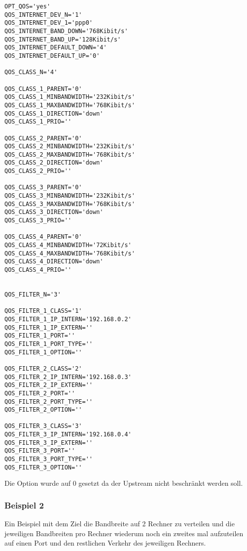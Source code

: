 \begin{small}
\begin{example}
\begin{verbatim}
OPT_QOS='yes'
QOS_INTERNET_DEV_N='1'
QOS_INTERNET_DEV_1='ppp0'
QOS_INTERNET_BAND_DOWN='768Kibit/s'
QOS_INTERNET_BAND_UP='128Kibit/s'
QOS_INTERNET_DEFAULT_DOWN='4'
QOS_INTERNET_DEFAULT_UP='0'

QOS_CLASS_N='4'

QOS_CLASS_1_PARENT='0'
QOS_CLASS_1_MINBANDWIDTH='232Kibit/s'
QOS_CLASS_1_MAXBANDWIDTH='768Kibit/s'
QOS_CLASS_1_DIRECTION='down'
QOS_CLASS_1_PRIO=''

QOS_CLASS_2_PARENT='0'
QOS_CLASS_2_MINBANDWIDTH='232Kibit/s'
QOS_CLASS_2_MAXBANDWIDTH='768Kibit/s'
QOS_CLASS_2_DIRECTION='down'
QOS_CLASS_2_PRIO=''

QOS_CLASS_3_PARENT='0'
QOS_CLASS_3_MINBANDWIDTH='232Kibit/s'
QOS_CLASS_3_MAXBANDWIDTH='768Kibit/s'
QOS_CLASS_3_DIRECTION='down'
QOS_CLASS_3_PRIO=''

QOS_CLASS_4_PARENT='0'
QOS_CLASS_4_MINBANDWIDTH='72Kibit/s'
QOS_CLASS_4_MAXBANDWIDTH='768Kibit/s'
QOS_CLASS_4_DIRECTION='down'
QOS_CLASS_4_PRIO=''


QOS_FILTER_N='3'

QOS_FILTER_1_CLASS='1'
QOS_FILTER_1_IP_INTERN='192.168.0.2'
QOS_FILTER_1_IP_EXTERN=''
QOS_FILTER_1_PORT=''
QOS_FILTER_1_PORT_TYPE=''
QOS_FILTER_1_OPTION=''

QOS_FILTER_2_CLASS='2'
QOS_FILTER_2_IP_INTERN='192.168.0.3'
QOS_FILTER_2_IP_EXTERN=''
QOS_FILTER_2_PORT=''
QOS_FILTER_2_PORT_TYPE=''
QOS_FILTER_2_OPTION=''

QOS_FILTER_3_CLASS='3'
QOS_FILTER_3_IP_INTERN='192.168.0.4'
QOS_FILTER_3_IP_EXTERN=''
QOS_FILTER_3_PORT=''
QOS_FILTER_3_PORT_TYPE=''
QOS_FILTER_3_OPTION=''
\end{verbatim}
\end{example}
\end{small}

   Die Option  wurde auf 0 gesetzt da der Upstream
   nicht beschränkt werden soll.




\subsubsection{Beispiel 2}



   Ein Beispiel mit dem Ziel die Bandbreite auf 2 Rechner zu verteilen
   und die jeweiligen Bandbreiten pro Rechner wiederum noch ein zweites
   mal aufzuteilen auf einen Port und den restlichen Verkehr des
   jeweiligen Rechners.

